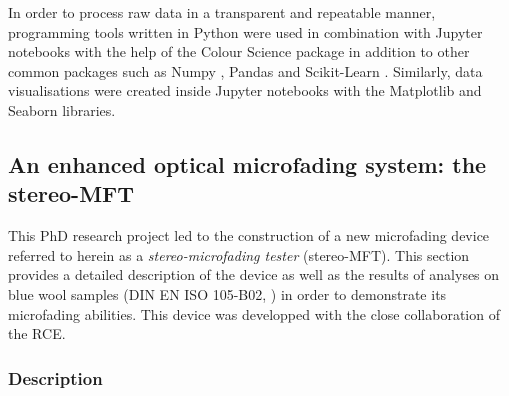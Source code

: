 In order to process raw data in a transparent and repeatable manner, programming tools written in Python were used in combination with Jupyter notebooks \citep{kluyver_jupyter_2016} with the help of the Colour Science package \citep{mansencal_colour_2022} in addition to other common packages such as Numpy \citep{harris_array_2020}, Pandas \citep{mckinney_data_2010} and Scikit-Learn \citep{pedregosa_scikit-learn_2011}. Similarly, data visualisations were created inside Jupyter notebooks with the Matplotlib \citep{hunter_matplotlib_2007} and Seaborn \citep{waskom_seaborn_2021} libraries.\\




\subsection{An enhanced optical microfading system: the stereo-MFT}

This PhD research project led to the construction of a new microfading device referred to herein as a \textit{stereo-microfading tester} (stereo-MFT). This section provides a detailed description of the device as well as the results of analyses on blue wool samples (DIN EN ISO 105-B02, \cite{deutsches_institut_fur_normung_ev_din_2014}) in order to demonstrate its microfading abilities. This device was developped with the close collaboration of the \gls{RCE}.  \\



\subsubsection{Description}

